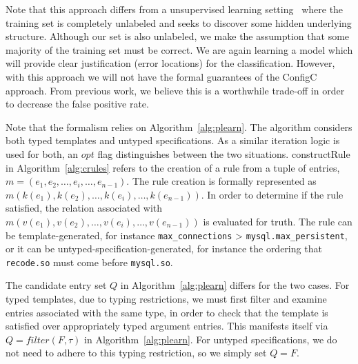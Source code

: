 Note that this approach differs from a unsupervised learning setting~\cite{hastie2009unsupervised} where the training set is completely unlabeled and seeks to discover some hidden underlying structure.
Although our set is also unlabeled, we make the assumption that some majority of the training set must be correct.%
We are again learning a model which will provide clear justification (error locations) for the classification.
However, with this approach we will not have the formal guarantees of the ConfigC approach.
From previous work, we believe this is a worthwhile trade-off in order to decrease the false positive rate.

\iffalse
Note that the formalism relies on Algorithm~\ref{alg:plearn}. The algorithm considers both typed templates and
untyped specifications. As a similar iteration logic is used for both, an $opt$ flag distinguishes between the two situations.
constructRule in Algorithm~\ref{alg:crules} refers to the creation of a rule from a tuple of entries, 
$m = (e_1, e_2, \ldots, e_i, \ldots, e_{n-1})$.
The rule creation is formally represented as $m(k(e_1), k(e_2), \ldots, k(e_i), \ldots, k(e_{n-1}))$. 
In order to determine if the rule satisfied, the relation associated with $m(v(e_1), v(e_2), \ldots, v(e_i), \ldots, v(e_{n-1}))$ is evaluated for truth.
The rule can be template-generated, for instance {\tt max\_connections} > {\tt mysql.max\_persistent}, or
it can be untyped-specification-generated, for instance the ordering that {\tt recode.so} must come before 
{\tt mysql.so}.

The candidate entry set $Q$ in Algorithm~\ref{alg:plearn} 
differs for the two cases.
For typed templates, due to typing restrictions, 
we must first filter and examine entries associated with the same type, in order to check that 
the template is satisfied over appropriately typed argument entries. This manifests itself via $Q = filter(F,\tau)$
in Algorithm~\ref{alg:plearn}. For
untyped specifications, we do not need to adhere to this typing restriction, so we simply set $Q = F$.



